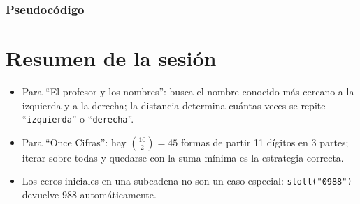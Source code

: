 \documentclass[12pt, oneside]{article}
\begin{document}
\subsubsection{Pseudocódigo}

\vspace{5cm}

\newpage

\section{Resumen de la sesión}

\begin{itemize}
  \item Para ``El profesor y los nombres'': busca el nombre conocido más
        cercano a la izquierda y a la derecha; la distancia determina
        cuántas veces se repite ``\texttt{izquierda}'' o
        ``\texttt{derecha}''.
  \item Para ``Once Cifras'': hay $\binom{10}{2} = 45$ formas de partir
        11 dígitos en 3 partes; iterar sobre todas y quedarse con la
        suma mínima es la estrategia correcta.
  \item Los ceros iniciales en una subcadena no son un caso especial:
        \texttt{stoll("0988")} devuelve 988 automáticamente.
\end{itemize}
\end{document}
